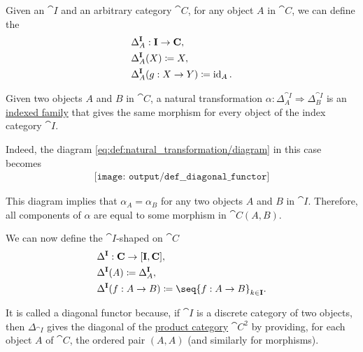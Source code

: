 \begin{definition}\label{def:diagonal_functor}
  Given an  \( \cat{I} \) and an arbitrary category \( \cat{C} \), for any object \( A \) in \( \cat{C} \), we can define the 
  \begin{equation*}
    \begin{aligned}
      &\Delta_A^{\operatorname{\mathbf{I}}}: \operatorname{\mathbf{I}} \to \operatorname{\mathbf{C}}, \\
      &\Delta_A^{\operatorname{\mathbf{I}}}(X) \coloneqq X, \\
      &\Delta_A^{\operatorname{\mathbf{I}}}(g: X \to Y) \coloneqq \operatorname{id}_A.
    \end{aligned}
  \end{equation*}

  Given two objects \( A \) and \( B \) in \( \cat{C} \), a natural transformation \( \alpha: \Delta_A^{\cat{I}} \Rightarrow \Delta_B^{\cat{I}} \) is an \hyperref[def:cartesian_product/indexed_family]{indexed family} that gives the same morphism for every object of the index category \( \cat{I} \).

  Indeed, the diagram \eqref{eq:def:natural_transformation/diagram} in this case becomes
  \begin{equation}\label{eq:def:diagonal_functor/nat}
    \begin{aligned}
      \texttt{[image: output/def\_\_diagonal\_functor]}
    \end{aligned}
  \end{equation}

  This diagram implies that \( \alpha_A = \alpha_B \) for any two objects \( A \) and \( B \) in \( \cat{I} \). Therefore, all components of \( \alpha \) are equal to some morphism in \( \cat{C}(A, B) \).

  We can now define the \( \cat{I} \)-shaped  on \( \cat{C} \)
  \begin{equation*}
    \begin{aligned}
      &\Delta^{\cat{I}}: \cat{C} \to [\cat{I}, \cat{C}], \\
      &\Delta^{\cat{I}}(A) \coloneqq \Delta_A^{\cat{I}}, \\
      &\Delta^{\cat{I}}(f: A \to B) \coloneqq \seq{ f: A \to B }_{k \in \cat{I}}.
    \end{aligned}
  \end{equation*}

  It is called a diagonal functor because, if \( \cat{I} \) is a discrete category of two objects, then \( \Delta_{\cat{I}} \) gives the diagonal of the \hyperref[def:product_category]{product category} \( \cat{C}^2 \) by providing, for each object \( A \) of \( \cat{C} \), the ordered pair \( (A, A) \) (and similarly for morphisms).
\end{definition}

